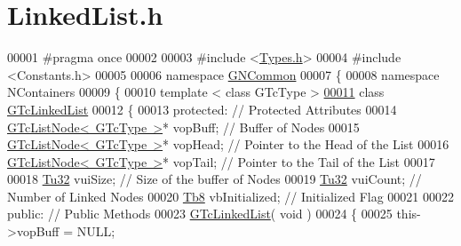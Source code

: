 \hypertarget{_linked_list_8h_source}{}\section{Linked\+List.\+h}
\label{_linked_list_8h_source}

\begin{DoxyCode}
00001 \textcolor{preprocessor}{#pragma once}
00002 
00003 \textcolor{preprocessor}{#include <\mbox{\hyperlink{_types_8h}{Types.h}}>}
00004 \textcolor{preprocessor}{#include <Constants.h>}
00005 
00006 \textcolor{keyword}{namespace }\mbox{\hyperlink{namespace_g_n_common}{GNCommon}}
00007 \{
00008    \textcolor{keyword}{namespace }NContainers
00009    \{
00010       \textcolor{keyword}{template} < \textcolor{keyword}{class} GTcType >
\mbox{\hyperlink{class_g_n_common_1_1_n_containers_1_1_g_tc_linked_list}{00011}}       \textcolor{keyword}{class }\mbox{\hyperlink{class_g_n_common_1_1_n_containers_1_1_g_tc_linked_list}{GTcLinkedList}}
00012       \{
00013       \textcolor{keyword}{protected}:     \textcolor{comment}{// Protected Attributes}
00014          \mbox{\hyperlink{class_g_n_common_1_1_n_containers_1_1_g_tc_list_node}{GTcListNode< GTcType >}}* vopBuff; \textcolor{comment}{// Buffer of Nodes}
00015          \mbox{\hyperlink{class_g_n_common_1_1_n_containers_1_1_g_tc_list_node}{GTcListNode< GTcType >}}* vopHead; \textcolor{comment}{// Pointer to the Head of the List}
00016          \mbox{\hyperlink{class_g_n_common_1_1_n_containers_1_1_g_tc_list_node}{GTcListNode< GTcType >}}* vopTail; \textcolor{comment}{// Pointer to the Tail of the List}
00017 
00018          \mbox{\hyperlink{namespace_g_n_common_a941b527ef318f318aed7903dc832b7e4}{Tu32}} vuiSize;       \textcolor{comment}{// Size of the buffer of Nodes}
00019          \mbox{\hyperlink{namespace_g_n_common_a941b527ef318f318aed7903dc832b7e4}{Tu32}} vuiCount;      \textcolor{comment}{// Number of Linked Nodes}
00020          \mbox{\hyperlink{namespace_g_n_common_a8115dc7ed53b6e5b52e6bfde1632ea74}{Tb8}}  vbInitialized; \textcolor{comment}{// Initialized Flag}
00021 
00022       \textcolor{keyword}{public}:        \textcolor{comment}{// Public Methods}
00023          \mbox{\hyperlink{class_g_n_common_1_1_n_containers_1_1_g_tc_linked_list}{GTcLinkedList}}( \textcolor{keywordtype}{void} )
00024          \{
00025             this->vopBuff = NULL;

\end{DoxyCode}
